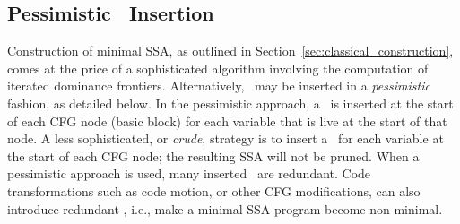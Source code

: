 {\subsection{Pessimistic \phifun\ Insertion}

Construction of minimal SSA,
as outlined in Section~\ref{sec:classical_construction}, 
comes at the price of a sophisticated algorithm involving 
the computation of iterated dominance frontiers. 
Alternatively, \phifuns\ may be inserted in a \textit{pessimistic} fashion,
as detailed below. 
%
In the pessimistic approach, a \phifun\ is inserted at the start of each CFG node
(basic block) for each variable that is live at the start of that
node.
A less sophisticated, or \textit{crude}, %
strategy is to insert a \phifun\ for
each variable at the start of each CFG node;
the resulting SSA will not be pruned.
When a pessimistic approach is used, many inserted \phifuns\ are
redundant. 
Code transformations such as code motion, or other CFG modifications, 
can also introduce redundant \phifuns, i.e.,
make a minimal SSA program become non-minimal.

}
